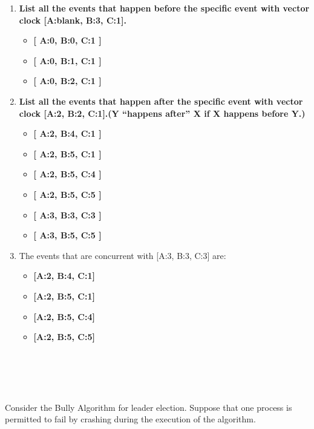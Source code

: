 \documentclass[12pt,a4paper]{article}
\begin{document}
\begin{enumerate}[label=(\alph*)]
\item \textbf{List all the events that happen before the specific event with vector clock [A:blank, B:3, C:1].}


\begin{itemize}
\item \textbf{[ A:0, B:0, C:1 ]} 
\item \textbf{[ A:0, B:1, C:1 ]} 
\item \textbf{[ A:0, B:2, C:1 ]} 

\end{itemize}

\item \textbf{List all the events that happen after the specific event with vector clock [A:2, B:2, C:1].(Y “happens after” X if X happens before Y.)}

\begin{itemize}

\item \textbf{[ A:2, B:4, C:1 ]}
\item \textbf{[ A:2, B:5, C:1 ]}
\item \textbf{[ A:2, B:5, C:4 ]}
\item \textbf{[ A:2, B:5, C:5 ]}
\item \textbf{[ A:3, B:3, C:3 ]}
\item \textbf{[ A:3, B:5, C:5 ]} 

\end{itemize}

\item The events that are concurrent with [A:3, B:3, C:3] are:

\begin{itemize}
\item \textbf{[A:2, B:4, C:1]}
\item \textbf{[A:2, B:5, C:1]}
\item \textbf{[A:2, B:5, C:4]}
\item \textbf{[A:2, B:5, C:5]}
\end{itemize}

\end{enumerate}


 
\clearpage

\section{~}

Consider the Bully Algorithm for leader election. Suppose that one process is permitted to fail by crashing during the execution of the algorithm.
\end{document}
